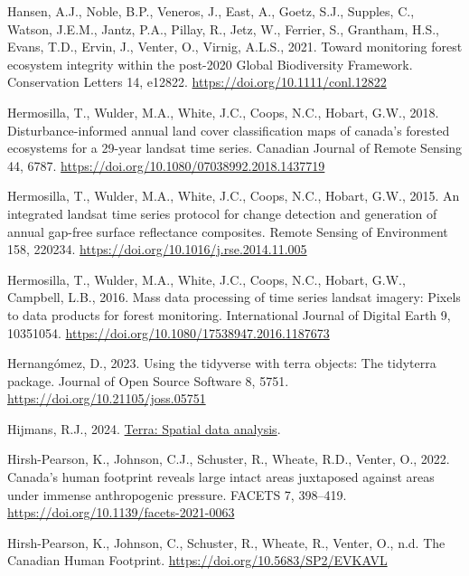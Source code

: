 \documentclass[
]{agujournal2019}
\newlength{\cslhangindent}
\newenvironment{CSLReferences}[2] %
 {\begin{list}{}{%
  \setlength{\itemindent}{0pt}
  \setlength{\leftmargin}{0pt}
  \setlength{\parsep}{0pt}
  \ifodd #1
   \setlength{\leftmargin}{\cslhangindent}
   \setlength{\itemindent}{-1\cslhangindent}
  \fi
  \setlength{\itemsep}{#2\baselineskip}}}
 {\end{list}}
\begin{document}
\begin{CSLReferences}{1}{0}
Hansen, A.J., Noble, B.P., Veneros, J., East, A., Goetz, S.J., Supples,
C., Watson, J.E.M., Jantz, P.A., Pillay, R., Jetz, W., Ferrier, S.,
Grantham, H.S., Evans, T.D., Ervin, J., Venter, O., Virnig, A.L.S.,
2021. Toward monitoring forest ecosystem integrity within the post-2020
Global Biodiversity Framework. Conservation Letters 14, e12822.
\url{https://doi.org/10.1111/conl.12822}

Hermosilla, T., Wulder, M.A., White, J.C., Coops, N.C., Hobart, G.W.,
2018. Disturbance-informed annual land cover classification maps of
canada's forested ecosystems for a 29-year landsat time series. Canadian
Journal of Remote Sensing 44, 6787.
\url{https://doi.org/10.1080/07038992.2018.1437719}

Hermosilla, T., Wulder, M.A., White, J.C., Coops, N.C., Hobart, G.W.,
2015. An integrated landsat time series protocol for change detection
and generation of annual gap-free surface reflectance composites. Remote
Sensing of Environment 158, 220234.
\url{https://doi.org/10.1016/j.rse.2014.11.005}

Hermosilla, T., Wulder, M.A., White, J.C., Coops, N.C., Hobart, G.W.,
Campbell, L.B., 2016. Mass data processing of time series landsat
imagery: Pixels to data products for forest monitoring. International
Journal of Digital Earth 9, 10351054.
\url{https://doi.org/10.1080/17538947.2016.1187673}

Hernangómez, D., 2023. Using the {tidyverse} with {terra} objects: The
{tidyterra} package. Journal of Open Source Software 8, 5751.
\url{https://doi.org/10.21105/joss.05751}

Hijmans, R.J., 2024. \href{https://rspatial.org/}{Terra: Spatial data
analysis}.

Hirsh-Pearson, K., Johnson, C.J., Schuster, R., Wheate, R.D., Venter,
O., 2022. Canada{'}s human footprint reveals large intact areas
juxtaposed against areas under immense anthropogenic pressure. FACETS 7,
398--419. \url{https://doi.org/10.1139/facets-2021-0063}

Hirsh-Pearson, K., Johnson, C., Schuster, R., Wheate, R., Venter, O.,
n.d. The Canadian Human Footprint.
\url{https://doi.org/10.5683/SP2/EVKAVL}


\end{CSLReferences}
\end{document}
